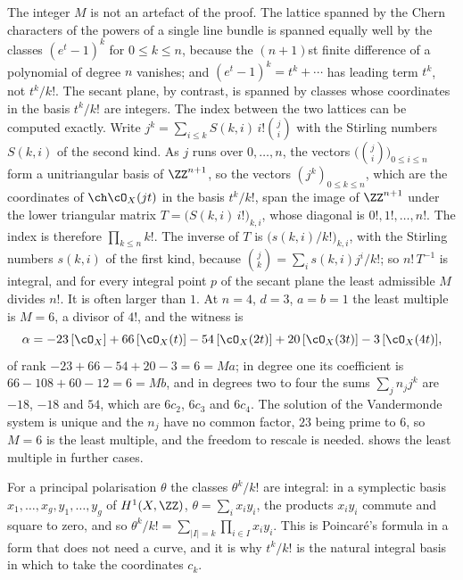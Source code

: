\begin{remark}%
\label{rem:themultiple}
The integer $M$ is not an artefact of the proof. The lattice spanned by the
Chern characters of the powers of a single line bundle is spanned equally well
by the classes $(e^{t}-1)^{k}$ for $0\le k\le n$, because the $(n+1)$st finite
difference of a polynomial of degree $n$ vanishes; and $(e^{t}-1)^{k}=t^{k}+
\cdots$ has leading term $t^{k}$, not $t^{k}/k!$. The secant plane, by
contrast, is spanned by classes whose coordinates in the basis $t^{k}/k!$ are
integers. The index between the two lattices can be computed exactly. Write
$j^{k}=\sum_{i\le k}S(k,i)\,i!\binom{j}{i}$ with the Stirling numbers $S(k,i)$
of the second kind. As $j$ runs over $0,\dots,n$, the vectors
$\bigl(\binom{j}{i}\bigr)_{0\le i\le n}$ form a unitriangular basis of
$\ZZ^{n+1}$, so the vectors $(j^{k})_{0\le k\le n}$, which are the coordinates
of $\ch\cO_{X}(jt)$ in the basis $t^{k}/k!$, span the image of $\ZZ^{n+1}$
under the lower triangular matrix $T=\bigl(S(k,i)\,i!\bigr)_{k,i}$, whose
diagonal is $0!,1!,\dots,n!$. The index is therefore $\prod_{k\le n}k!$. The
inverse of $T$ is $\bigl(s(k,i)/k!\bigr)_{k,i}$, with the Stirling numbers
$s(k,i)$ of the first kind, because $\binom{j}{k}=\sum_{i}s(k,i)j^{i}/k!$;
so $n!\,T^{-1}$ is integral, and for every integral point $p$ of the secant
plane the least admissible $M$ divides $n!$. It is often larger than $1$. At $n=4$, $d=3$, $a=b=1$ the least multiple is $M=6$,
a divisor of $4!$, and the witness is
\[
  \alpha=-23\,[\cO_{X}]+66\,[\cO_{X}(t)]-54\,[\cO_{X}(2t)]
         +20\,[\cO_{X}(3t)]-3\,[\cO_{X}(4t)],
\]
of rank $-23+66-54+20-3=6=Ma$; in degree one its coefficient is
$66-108+60-12=6=Mb$, and in degrees two to four the sums
$\sum_{j}n_{j}j^{k}$ are $-18$, $-18$ and $54$, which are $6c_{2}$, $6c_{3}$ and
$6c_{4}$. The solution of the Vandermonde system is unique and the $n_{j}$
have no common factor, $23$ being prime to $6$, so $M=6$ is the least
multiple, and the freedom to rescale is needed.  shows
the least multiple in further cases.

For a principal polarisation $\theta$ the classes $\theta^{k}/k!$ are
integral: in a symplectic basis $x_{1},\dots,x_{g},y_{1},\dots,y_{g}$ of
$H^{1}(X,\ZZ)$, $\theta=\sum_{i}x_{i}y_{i}$, the products $x_{i}y_{i}$
commute and square to zero, and so
$\theta^{k}/k!=\sum_{|I|=k}\prod_{i\in I}x_{i}y_{i}$. This is Poincar\'e's
formula in a form that does not need a curve, and it is why $t^{k}/k!$ is the
natural integral basis in which to take the coordinates $c_{k}$.
\end{remark}

